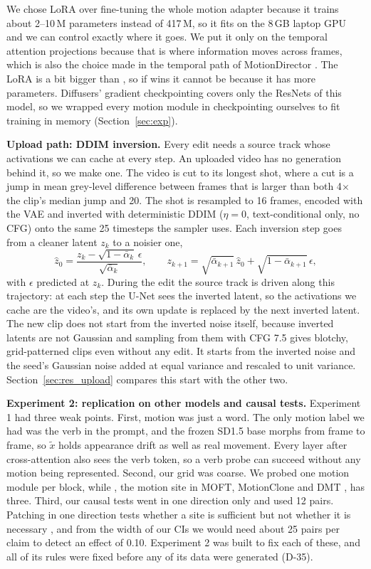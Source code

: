 \documentclass[twoside,english]{article}
\newcommand{\xd}{\tilde{x}}       %
\begin{document}
We chose LoRA over fine-tuning the whole motion adapter because it trains about 2--10\,M parameters
instead of 417\,M, so it fits on the 8\,GB laptop GPU and we can control exactly where it goes. We put
it only on the temporal attention projections because that is where information moves across frames,
which is also the choice made in the temporal path of MotionDirector \citep{zhao2024motiondirector}.
The  LoRA is a bit bigger than , so if  wins it cannot be because it
has more parameters. Diffusers' gradient checkpointing covers only the ResNets of this model, so we
wrapped every motion module in checkpointing ourselves to fit training in memory (Section~\ref{sec:exp}).

\textbf{Upload path: DDIM inversion.} Every edit needs a source track whose activations we can cache
at every step. An uploaded video has no generation behind it, so we make one. The video is cut to its
longest shot, where a cut is a jump in mean grey-level difference between frames that is larger than
both 4$\times$ the clip's median jump and 20. The shot is resampled to 16 frames, encoded with the VAE
and inverted with deterministic DDIM ($\eta = 0$, text-conditional only, no CFG) onto the same 25
timesteps the sampler uses. Each inversion step goes from a cleaner latent $z_k$ to a noisier one,
\begin{equation}
\hat z_0 = \frac{z_k - \sqrt{1-\bar\alpha_k}\,\epsilon}{\sqrt{\bar\alpha_k}}, \qquad
z_{k+1} = \sqrt{\bar\alpha_{k+1}}\,\hat z_0 + \sqrt{1-\bar\alpha_{k+1}}\,\epsilon,
\end{equation}
with $\epsilon$ predicted at $z_k$. During the edit the source track is driven along this trajectory:
at each step the U-Net sees the inverted latent, so the activations we cache are the video's, and its
own update is replaced by the next inverted latent. The new clip does not start from the inverted
noise itself, because inverted latents are not Gaussian and sampling from them with CFG 7.5 gives
blotchy, grid-patterned clips even without any edit. It starts from the inverted noise and the seed's
Gaussian noise added at equal variance and rescaled to unit variance. Section~\ref{sec:res_upload}
compares this start with the other two.

\textbf{Experiment 2: replication on other models and causal tests.} Experiment 1 had three weak
points. First, motion was just a word. The only motion label we had was the verb in the prompt, and
the frozen SD1.5 base morphs from frame to frame, so $\xd$ holds appearance drift as well as real
movement. Every layer after cross-attention also sees the verb token, so a verb probe can succeed
without any motion being represented. Second, our grid was coarse. We probed one motion module per
block, while , the motion site in MOFT, MotionClone and DMT \citep{yatim2024dmt},
has three. Third, our causal tests went in one direction only and used 12 pairs. Patching in one
direction tests whether a site is sufficient but not whether it is necessary
\citep{heimersheim2024patching}, and from the width of our CIs we would need about 25 pairs per claim
to detect an effect of 0.10. Experiment 2 was built to fix each of these, and all of its rules were
fixed before any of its data were generated (D-35).
\end{document}
